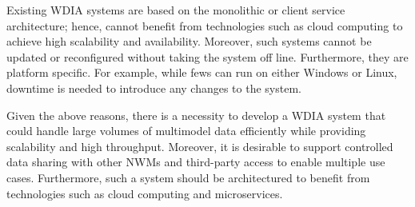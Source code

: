 Existing WDIA systems are based on 
the monolithic or client service architecture; hence, cannot benefit from technologies such as cloud computing to achieve high scalability and availability. Moreover, such systems cannot be updated or reconfigured without taking the system off line. Furthermore, they are platform specific. For example, while \acrshort{fews} can run on either Windows or Linux, downtime is needed to introduce any changes to the system. 

Given the above reasons, there is a necessity to develop a WDIA system that could handle large volumes of multimodel data efficiently while providing scalability and high throughput. Moreover, it is desirable to support controlled data sharing with other NWMs and third-party access to enable multiple use cases. Furthermore, such a system should be architectured to benefit from technologies such as cloud computing and microservices.
